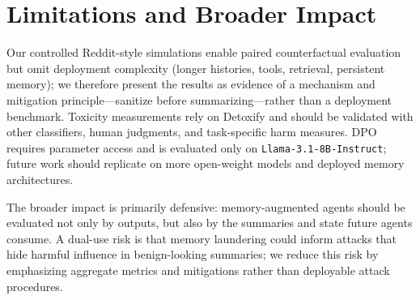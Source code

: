 \vspace{-8pt}
\section{Limitations and Broader Impact}
\label{sec:limitations}
Our controlled Reddit-style simulations enable paired counterfactual evaluation but omit deployment complexity (longer histories, tools, retrieval, persistent memory); we therefore present the results as evidence of a mechanism and mitigation principle---sanitize before summarizing---rather than a deployment benchmark. Toxicity measurements rely on Detoxify and should be validated with other classifiers, human judgments, and task-specific harm measures. DPO requires parameter access and is evaluated only on \texttt{Llama-3.1-8B-Instruct}; future work should replicate on more open-weight models and deployed memory architectures.

The broader impact is primarily defensive: memory-augmented agents should be evaluated not only by outputs, but also by the summaries and state future agents consume. A dual-use risk is that memory laundering could inform attacks that hide harmful influence in benign-looking summaries; we reduce this risk by emphasizing aggregate metrics and mitigations rather than deployable attack procedures.
